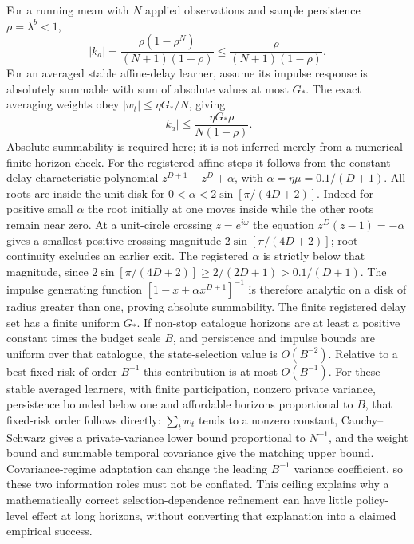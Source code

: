 For a running mean with $N$ applied observations and sample persistence $\rho=\lambda^b<1$,
\[
|k_a|=\frac{\rho(1-\rho^N)}{(N+1)(1-\rho)}
\le\frac{\rho}{(N+1)(1-\rho)}.
\]
For an averaged stable affine-delay learner, assume its impulse response is absolutely summable with sum of absolute values at most $G_*$.
The exact averaging weights obey $|w_t|\le\eta G_*/N$, giving
\[
|k_a|\le\frac{\eta G_*\rho}{N(1-\rho)}.
\]
Absolute summability is required here; it is not inferred merely from a numerical finite-horizon check.
For the registered affine steps it follows from the constant-delay characteristic polynomial $z^{D+1}-z^D+\alpha$, with $\alpha=\eta\mu=0.1/(D+1)$.
All roots are inside the unit disk for $0<\alpha<2\sin[\pi/(4D+2)]$.
Indeed for positive small $\alpha$ the root initially at one moves inside while the other roots remain near zero.
At a unit-circle crossing $z=e^{i\omega}$ the equation $z^D(z-1)=-\alpha$ gives a smallest positive crossing magnitude $2\sin[\pi/(4D+2)]$; root continuity excludes an earlier exit.
The registered $\alpha$ is strictly below that magnitude, since $2\sin[\pi/(4D+2)]\ge2/(2D+1)>0.1/(D+1)$.
The impulse generating function $[1-x+\alpha x^{D+1}]^{-1}$ is therefore analytic on a disk of radius greater than one, proving absolute summability.
The finite registered delay set has a finite uniform $G_*$.
If non-stop catalogue horizons are at least a positive constant times the budget scale $B$, and persistence and impulse bounds are uniform over that catalogue, the state-selection value is $O(B^{-2})$.
Relative to a best fixed risk of order $B^{-1}$ this contribution is at most $O(B^{-1})$.
For these stable averaged learners, with finite participation, nonzero private variance, persistence bounded below one and affordable horizons proportional to $B$, that fixed-risk order follows directly: $\sum_tw_t$ tends to a nonzero constant, Cauchy--Schwarz gives a private-variance lower bound proportional to $N^{-1}$, and the weight bound and summable temporal covariance give the matching upper bound.
Covariance-regime adaptation can change the leading $B^{-1}$ variance coefficient, so these two information roles must not be conflated.
This ceiling explains why a mathematically correct selection-dependence refinement can have little policy-level effect at long horizons, without converting that explanation into a claimed empirical success.
